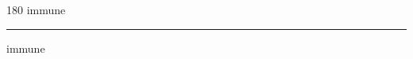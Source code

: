 
\begin{frame}
\begin{center}
\begin{turn}{180}
{\fontsize{2.5cm}{1em}\selectfont immune}
\end{turn}
\vspace{1em}\par  
\hrule
\vspace{1em}\par  
{\fontsize{2.5cm}{1em}\selectfont immune}
\end{center}
\end{frame}

